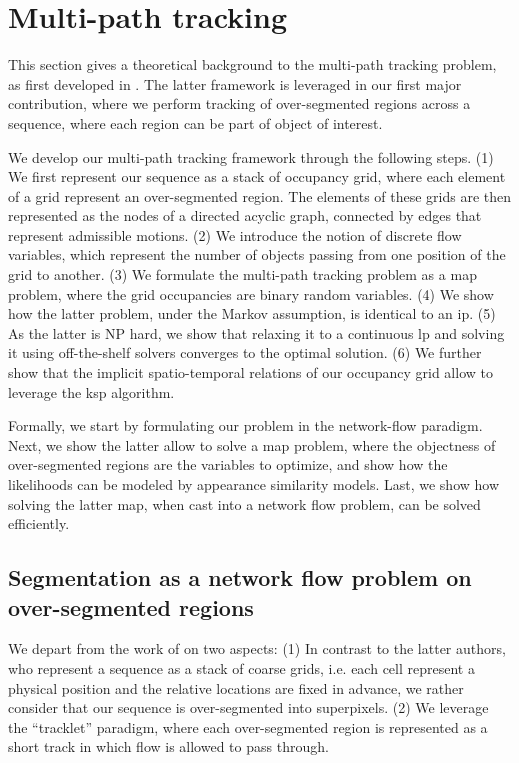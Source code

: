 \glsresetall

\section{Multi-path tracking}
This section gives a theoretical background to the multi-path tracking problem, as first developed in \cite{berclaz11}.
The latter framework is leveraged in our first major contribution, where we perform tracking of over-segmented regions across a sequence, where each region can be part of object of interest.

We develop our multi-path tracking framework through the following steps.
(1) We first represent our sequence as a stack of occupancy grid, where each element of a grid represent an over-segmented region.
The elements of these grids are then represented as the nodes of a directed acyclic graph, connected by edges that represent admissible motions.
(2) We introduce the notion of discrete flow variables, which represent the number of objects passing from one position of the grid to another.
(3) We formulate the multi-path tracking problem as a \gls{map} problem, where the grid occupancies are binary random variables.
(4) We show how the latter problem, under the Markov assumption, is identical to an \gls{ip}.
(5) As the latter is NP hard, we show that relaxing it to a continuous \gls{lp} and solving it using off-the-shelf solvers converges to the optimal solution.
(6) We further show that the implicit spatio-temporal relations of our occupancy grid allow to leverage the \gls{ksp} algorithm.

Formally, we start by formulating our problem in the network-flow paradigm.
Next, we show the latter allow to solve a \gls{map} problem, where the objectness of over-segmented regions are the variables to optimize, and show how the likelihoods can be modeled by appearance similarity models.
Last, we show how solving the latter \gls{map}, when cast into a network flow problem, can be solved efficiently.

\subsection{Segmentation as a network flow problem on over-segmented regions}
We depart from the work of \cite{berclaz11} on two aspects: (1) In contrast to the latter authors, who represent a sequence as a stack of coarse grids, i.e. each cell represent a physical position and the relative locations are fixed in advance, we rather consider that our sequence is over-segmented into superpixels.
(2) We leverage the ``tracklet'' paradigm, where each over-segmented region is represented as a short track in which flow is allowed to pass through.


